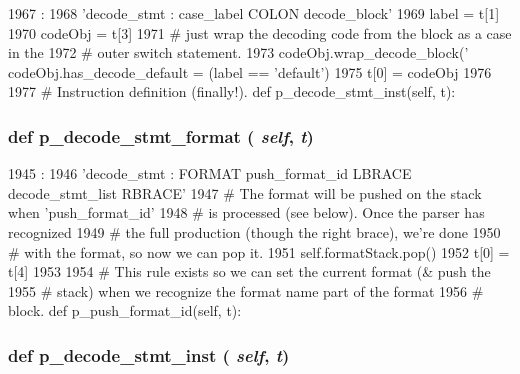 \begin{DoxyCode}
1967                                      :
1968         'decode_stmt : case_label COLON decode_block'
1969         label = t[1]
1970         codeObj = t[3]
1971         # just wrap the decoding code from the block as a case in the
1972         # outer switch statement.
1973         codeObj.wrap_decode_block('         codeObj.has_decode_default = (label == 'default')
1975         t[0] = codeObj
1976 
1977     # Instruction definition (finally!).
    def p_decode_stmt_inst(self, t):
\end{DoxyCode}
\hypertarget{classisa__parser_1_1ISAParser_a6646bac7601746202a0c7902a94c0f7c}{
\subsubsection[{p\_\-decode\_\-stmt\_\-format}]{\setlength{\rightskip}{0pt plus 5cm}def p\_\-decode\_\-stmt\_\-format ( {\em self}, \/   {\em t})}}
\label{classisa__parser_1_1ISAParser_a6646bac7601746202a0c7902a94c0f7c}



\begin{DoxyCode}
1945                                      :
1946         'decode_stmt : FORMAT push_format_id LBRACE decode_stmt_list RBRACE'
1947         # The format will be pushed on the stack when 'push_format_id'
1948         # is processed (see below).  Once the parser has recognized
1949         # the full production (though the right brace), we're done
1950         # with the format, so now we can pop it.
1951         self.formatStack.pop()
1952         t[0] = t[4]
1953 
1954     # This rule exists so we can set the current format (& push the
1955     # stack) when we recognize the format name part of the format
1956     # block.
    def p_push_format_id(self, t):
\end{DoxyCode}
\hypertarget{classisa__parser_1_1ISAParser_a129b6cf7f6a052f67fb554c6aef9b997}{
\subsubsection[{p\_\-decode\_\-stmt\_\-inst}]{\setlength{\rightskip}{0pt plus 5cm}def p\_\-decode\_\-stmt\_\-inst ( {\em self}, \/   {\em t})}}
\label{classisa__parser_1_1ISAParser_a129b6cf7f6a052f67fb554c6aef9b997}



